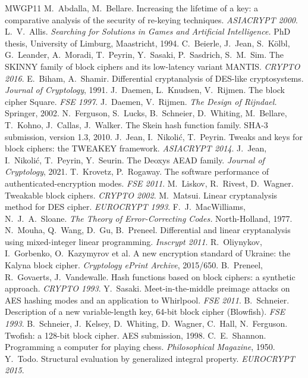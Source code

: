 \documentclass[11pt,a4paper]{article}
\begin{document}
\begin{thebibliography}{MWGP11}
 M.~Abdalla, M.~Bellare. Increasing the lifetime of a key: a comparative analysis of the
  security of re-keying techniques. \emph{ASIACRYPT 2000}.
 L.~V.~Allis. \emph{Searching for Solutions in Games and Artificial Intelligence.} PhD
  thesis, University of Limburg, Maastricht, 1994.
 C.~Beierle, J.~Jean, S.~K\"olbl, G.~Leander, A.~Moradi, T.~Peyrin, Y.~Sasaki,
  P.~Sasdrich, S.~M.~Sim. The SKINNY family of block ciphers and its low-latency variant MANTIS.
  \emph{CRYPTO 2016}.
 E.~Biham, A.~Shamir. Differential cryptanalysis of DES-like cryptosystems. \emph{Journal of
  Cryptology}, 1991.
 J.~Daemen, L.~Knudsen, V.~Rijmen. The block cipher Square. \emph{FSE 1997}.
 J.~Daemen, V.~Rijmen. \emph{The Design of Rijndael.} Springer, 2002.
 N.~Ferguson, S.~Lucks, B.~Schneier, D.~Whiting, M.~Bellare, T.~Kohno, J.~Callas,
  J.~Walker. The Skein hash function family. SHA-3 submission, version 1.3, 2010.
 J.~Jean, I.~Nikoli\'c, T.~Peyrin. Tweaks and keys for block ciphers: the TWEAKEY framework.
  \emph{ASIACRYPT 2014}.
 J.~Jean, I.~Nikoli\'c, T.~Peyrin, Y.~Seurin. The Deoxys AEAD family. \emph{Journal of
  Cryptology}, 2021.
 T.~Krovetz, P.~Rogaway. The software performance of authenticated-encryption modes.
  \emph{FSE 2011}.
 M.~Liskov, R.~Rivest, D.~Wagner. Tweakable block ciphers. \emph{CRYPTO 2002}.
 M.~Matsui. Linear cryptanalysis method for DES cipher. \emph{EUROCRYPT 1993}.
 F.~J.~MacWilliams, N.~J.~A.~Sloane. \emph{The Theory of Error-Correcting Codes.}
  North-Holland, 1977.
 N.~Mouha, Q.~Wang, D.~Gu, B.~Preneel. Differential and linear cryptanalysis using
  mixed-integer linear programming. \emph{Inscrypt 2011}.
 R.~Oliynykov, I.~Gorbenko, O.~Kazymyrov et al. A new encryption standard of Ukraine: the
  Kalyna block cipher. \emph{Cryptology ePrint Archive}, 2015/650.
 B.~Preneel, R.~Govaerts, J.~Vandewalle. Hash functions based on block ciphers: a synthetic
  approach. \emph{CRYPTO 1993}.
 Y.~Sasaki. Meet-in-the-middle preimage attacks on AES hashing modes and an application to
  Whirlpool. \emph{FSE 2011}.
 B.~Schneier. Description of a new variable-length key, 64-bit block cipher (Blowfish).
  \emph{FSE 1993}.
 B.~Schneier, J.~Kelsey, D.~Whiting, D.~Wagner, C.~Hall, N.~Ferguson. Twofish: a 128-bit
  block cipher. AES submission, 1998.
 C.~E.~Shannon. Programming a computer for playing chess. \emph{Philosophical Magazine}, 1950.
 Y.~Todo. Structural evaluation by generalized integral property. \emph{EUROCRYPT 2015}.
\end{thebibliography}
\end{document}
